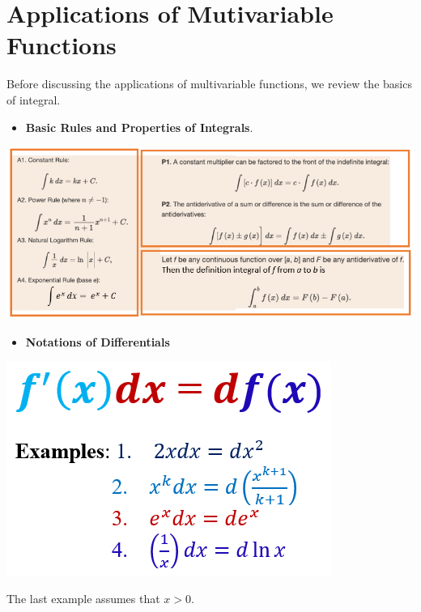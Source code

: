 \documentclass[
]{book}
\providecommand{\tightlist}{%
  \setlength{\itemsep}{0pt}\setlength{\parskip}{0pt}}
\begin{document}
\hfill\break

\hypertarget{applications-of-mutivariable-functions}{%
\chapter{Applications of Mutivariable Functions}\label{applications-of-mutivariable-functions}}

Before discussing the applications of multivariable functions, we review the basics of integral.

\begin{itemize}
\tightlist
\item
  \textbf{Basic Rules and Properties of Integrals}.
\end{itemize}

\begin{center}\includegraphics[width=0.95\linewidth]{img14/w13-ImportantProperties} \end{center}

\hfill\break

\begin{itemize}
\tightlist
\item
  \textbf{Notations of Differentials}
\end{itemize}

\begin{center}\includegraphics[width=0.55\linewidth]{img14/w13-differentialNotation} \end{center}

The last example assumes that \(x > 0\).
\end{document}
